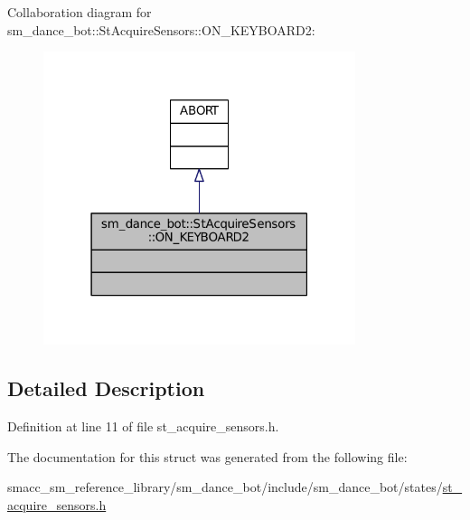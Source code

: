 Collaboration diagram for sm\+\_\+dance\+\_\+bot\+:\+:St\+Acquire\+Sensors\+:\+:O\+N\+\_\+\+K\+E\+Y\+B\+O\+A\+R\+D2\+:
\nopagebreak
\begin{figure}[H]
\begin{center}
\leavevmode
\includegraphics[width=259pt]{structsm__dance__bot_1_1StAcquireSensors_1_1ON__KEYBOARD2__coll__graph}
\end{center}
\end{figure}


\subsection{Detailed Description}


Definition at line 11 of file st\+\_\+acquire\+\_\+sensors.\+h.



The documentation for this struct was generated from the following file\+:\begin{DoxyCompactItemize}
\item 
smacc\+\_\+sm\+\_\+reference\+\_\+library/sm\+\_\+dance\+\_\+bot/include/sm\+\_\+dance\+\_\+bot/states/\hyperlink{st__acquire__sensors_8h}{st\+\_\+acquire\+\_\+sensors.\+h}\end{DoxyCompactItemize}
